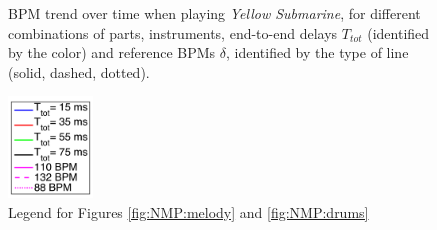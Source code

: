 \begin{figure}[!th]
	
		\hfil
\caption{BPM trend over time when playing \textit{Yellow Submarine}, for different combinations of parts, instruments, end-to-end delays $T_{tot}$ (identified by the color) and reference BPMs $\delta$, identified by the type of line (solid, dashed, dotted). }
\label{fig:NMP:qualTot}
\end{figure}

\begin{figure}[!th]
	\centering
	\includegraphics[width=0.2\textwidth]{img/NMP/legend_smaller}
	\caption{Legend for Figures \ref{fig:NMP:melody} and \ref{fig:NMP:drums} }
	\label{fig:NMP:legend} 
\end{figure}


